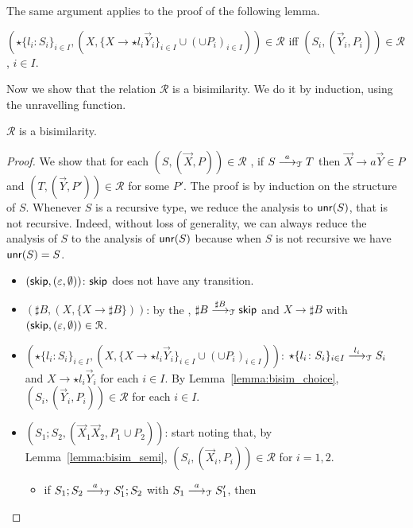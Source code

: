 The same argument applies to the proof of the following lemma.

\begin{lemma}
\label{lemma:bisim_choice}
	$(\star\{l_i\colon S_i\}_{i\in I}, (X, \{X \rightarrow \star l_i
    \vec Y_i\}_{i\in I} \cup (\cup  P_i)_{i\in I}))\in\mathcal{R}$ iff 
	$(S_i, (\vec Y_i,  P_i))\in\mathcal{R}$, $i \in I$.
\end{lemma}

Now we show that the relation $\mathcal{R}$ is a bisimilarity. We do it
by induction, using the unravelling function. 

\begin{theorem}
\label{thm:cfst_vs_grammar}
	$\mathcal{R}$ is a bisimilarity.
\end{theorem}

\begin{proof}
	We show that for each $(S, (\vec X, P))\in \mathcal{R}$	, if
	$S \LTSderives[a] T$ then $\vec X \rightarrow a \vec Y\in P$
	and $(T, (\vec Y, P'))\in \mathcal{R}$ for some $P'$. The proof is by
	induction on the structure of $S$. Whenever $S$ is a 
	recursive type, we reduce the analysis to $\Unravel(S)$, that
	is not recursive. Indeed, without loss of generality, 
	we can always reduce the analysis of $S$
	to the analysis of $\Unravel(S)$
	because when $S$ is not recursive we have
	$\Unravel(S)=S$.
	\begin{itemize}
		\item $(\skipk, (\varepsilon, \emptyset))$: $\skipk$ does not have any
		transition.
		\item $(\sharp B,(X,\{X \rightarrow \sharp B\}))$: by the \LTS,
		$\sharp B\LTSderives[\sharp B] \skipk$ and $X\rightarrow \sharp B$ with
		$(\skipk, (\varepsilon, \emptyset))\in \mathcal{R}$.
		\item $(\star\{l_i\colon S_i\}_{i\in I}, (X, \{X \rightarrow \star l_i
    	\vec Y_i\}_{i\in I} \cup (\cup  P_i)_{i\in I}))$: 
    	$\star\{l_i\colon S_i\}_{i\in I}\LTSderives[l_i] S_i$ and 
    	$X \rightarrow \star l_i \vec Y_i$ for each $i\in I$. By 
    	Lemma~\ref{lemma:bisim_choice}, $(S_i, (\vec Y_i,  P_i))\in\mathcal{R}$
    	for each $i\in I$. 
    	\item $(S_1;S_2, (\vec X_1\vec X_2,  P_1 \cup  P_2))$: start noting
    	that, by Lemma~\ref{lemma:bisim_semi}, 
    	$(S_i, (\vec X_i, P_i))\in \mathcal{R}$ for $i=1,2$. 
    	\begin{itemize}
    	\item if 
    	$S_1;S_2\LTSderives[a] S_1'; S_2$ with $S_1\LTSderives[a] S_1'$, then 

\end{itemize}
\end{itemize}
\end{proof}
